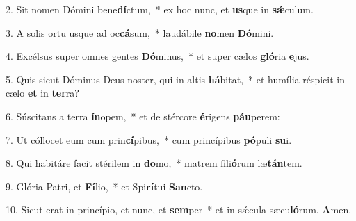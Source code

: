 \item 2. Sit nomen Dómini bene\textbf{dí}ctum,~* ex hoc nunc, et \textbf{us}que in \textbf{sǽ}culum.

\item 3. A solis ortu usque ad oc\textbf{cá}sum,~* laudábile \textbf{no}men \textbf{Dó}mini.

\item 4. Excélsus super omnes gentes \textbf{Dó}minus,~* et super cælos \textbf{gló}ria \textbf{e}jus.

\item 5. Quis sicut Dóminus Deus noster, qui in altis \textbf{há}bitat,~* et humília réspicit in cælo \textbf{et} in \textbf{ter}ra?

\item 6. Súscitans a terra \textbf{ín}opem,~* et de stércore \textbf{é}rigens \textbf{páu}perem:

\item 7. Ut cóllocet eum cum prin\textbf{cí}pibus,~* cum princípibus \textbf{pó}puli \textbf{su}i.

\item 8. Qui habitáre facit stérilem in \textbf{do}mo,~* matrem fili\textbf{ó}rum læ\textbf{tán}tem.

\item 9. Glória Patri, et \textbf{Fí}lio,~* et Spi\textbf{rí}tui \textbf{San}cto.

\item 10. Sicut erat in princípio, et nunc, et \textbf{sem}per~* et in sǽcula sæcu\textbf{ló}rum. \textbf{A}men.
